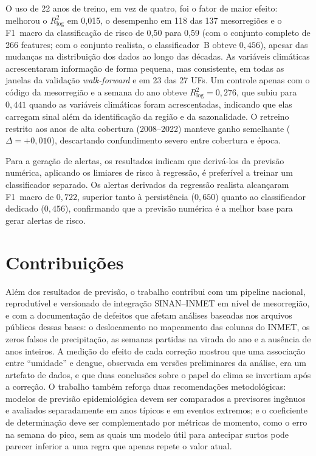 O uso de 22 anos de treino, em vez de quatro, foi o fator de maior efeito: melhorou o $R^2_{\log}$ em 0,015, o desempenho em 118 das 137 mesorregiões e o F1~macro da classificação de risco de 0,50 para 0,59 (com o conjunto completo de 266 features; com o conjunto realista, o classificador~B obteve $0{,}456$), apesar das mudanças na distribuição dos dados ao longo das décadas. As variáveis climáticas acrescentaram informação de forma pequena, mas consistente, em todas as janelas da validação \textit{walk-forward} e em 23 das 27 UFs. Um controle apenas com o código da mesorregião e a semana do ano obteve $R^2_{\log}=0{,}276$, que subiu para $0{,}441$ quando as variáveis climáticas foram acrescentadas, indicando que elas carregam sinal além da identificação da região e da sazonalidade. O retreino restrito aos anos de alta cobertura (2008--2022) manteve ganho semelhante ($\Delta=+0{,}010$), descartando confundimento severo entre cobertura e época.

Para a geração de alertas, os resultados indicam que derivá-los da previsão numérica, aplicando os limiares de risco à regressão, é preferível a treinar um classificador separado. Os alertas derivados da regressão realista alcançaram F1~macro de $0{,}722$, superior tanto à persistência ($0{,}650$) quanto ao classificador dedicado ($0{,}456$), confirmando que a previsão numérica é a melhor base para gerar alertas de risco.

\section{Contribuições}

Além dos resultados de previsão, o trabalho contribui com um pipeline nacional, reprodutível e versionado de integração SINAN--INMET em nível de mesorregião, e com a documentação de defeitos que afetam análises baseadas nos arquivos públicos dessas bases: o deslocamento no mapeamento das colunas do INMET, os zeros falsos de precipitação, as semanas partidas na virada do ano e a ausência de anos inteiros. A medição do efeito de cada correção mostrou que uma associação entre ``umidade'' e dengue, observada em versões preliminares da análise, era um artefato de dados, e que duas conclusões sobre o papel do clima se invertiam após a correção. O trabalho também reforça duas recomendações metodológicas: modelos de previsão epidemiológica devem ser comparados a previsores ingênuos e avaliados separadamente em anos típicos e em eventos extremos; e o coeficiente de determinação deve ser complementado por métricas de momento, como o erro na semana do pico, sem as quais um modelo útil para antecipar surtos pode parecer inferior a uma regra que apenas repete o valor atual.

